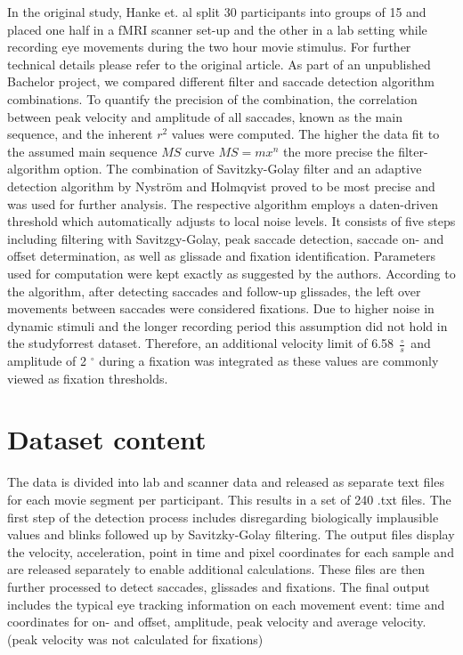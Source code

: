 \documentclass[10pt,a4paper,twocolumn]{article}
\begin{document}
In the original study, Hanke et. al \cite{Hanke.2016} split 30 participants into groups of 15 and placed one half in a fMRI scanner set-up and the other in a lab setting while recording eye movements during the two hour movie stimulus. For further technical details please refer to the original article. As part of an unpublished Bachelor project, we compared different filter and saccade detection algorithm combinations. To quantify the precision of the combination, the correlation between peak velocity and amplitude of all saccades, known as the main sequence, and the inherent $r^2$ values were computed. The higher the data fit to the assumed main sequence $MS$ curve $MS=mx^n$ the more precise the filter-algorithm option. The combination of Savitzky-Golay filter and an adaptive detection algorithm by Nyström and Holmqvist proved to be most precise and was used for further analysis. The respective algorithm employs a daten-driven threshold which automatically adjusts to local noise levels. It consists of five steps including filtering with Savitzgy-Golay, peak saccade detection, saccade on- and offset determination, as well as glissade and fixation identification. Parameters used for computation were kept exactly as suggested by the authors. According to the algorithm, after detecting saccades and follow-up glissades, the left over movements between saccades were considered fixations. Due to higher noise in dynamic stimuli and the longer recording period this assumption did not hold in the studyforrest dataset. Therefore, an additional velocity limit of 6.58 $\frac{\circ}{s}$ and amplitude of 2 $^\circ$ during a fixation was integrated as these values are commonly viewed as fixation thresholds.\cite{Holmqvist.2011,Henderson.1997}


\section*{Dataset content}
The data is divided into lab and scanner data and released as separate text files for each movie segment per participant. This results in a set of 240 .txt files. The first step of the detection process includes disregarding biologically implausible values and blinks followed up by  Savitzky-Golay filtering. The output files display the velocity, acceleration, point in time and pixel coordinates for each sample and are released separately to enable additional calculations. These files are then further processed to detect saccades, glissades and fixations. The final output includes the typical eye tracking information on each movement event: time and coordinates for on- and offset, amplitude, peak velocity and average velocity. (peak velocity was not calculated for fixations)  
\end{document}
